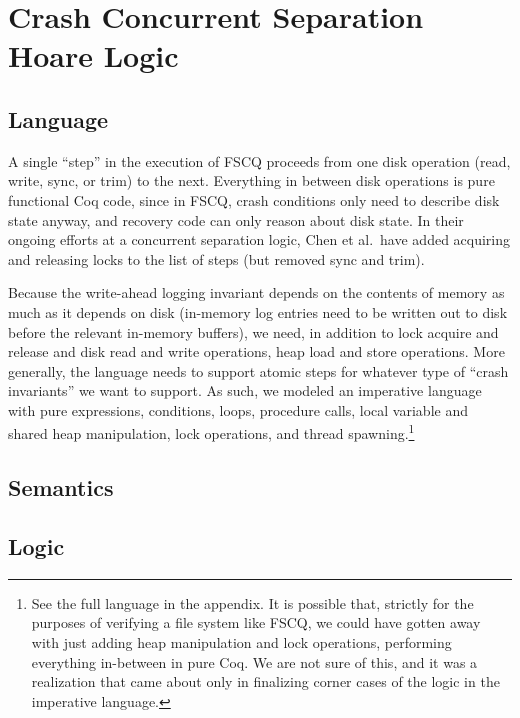 
\section{Crash Concurrent Separation Hoare Logic}

\subsection{Language}

A single ``step'' in the execution of FSCQ proceeds from one disk operation
(read, write, sync, or trim) to the next. Everything in between disk operations
is pure functional Coq code, since in FSCQ, crash conditions only need to
describe disk state anyway, and recovery code can only reason about disk state.
In their ongoing efforts at a concurrent separation logic, Chen et al.\ have
added acquiring and releasing locks to the list of steps (but removed sync and
trim).

Because the write-ahead logging invariant depends on the contents of memory as
much as it depends on disk (in-memory log entries need to be written out to disk
before the relevant in-memory buffers), we need, in addition to lock acquire and
release and disk read and write operations, heap load and store operations. More
generally, the language needs to support atomic steps for whatever type of
``crash invariants'' we want to support. As such, we modeled an imperative
language with pure expressions, conditions, loops, procedure calls, local
variable and shared heap manipulation, lock operations, and thread
spawning.\footnote{See the full language in the appendix. It is possible that,
strictly for the purposes of verifying a file system like FSCQ, we could have
gotten away with just adding heap manipulation and lock operations, performing
everything in-between in pure Coq. We are not sure of this, and it was a
realization that came about only in finalizing corner cases of the logic in the
imperative language.}


\subsection{Semantics}

\subsection{Logic}

